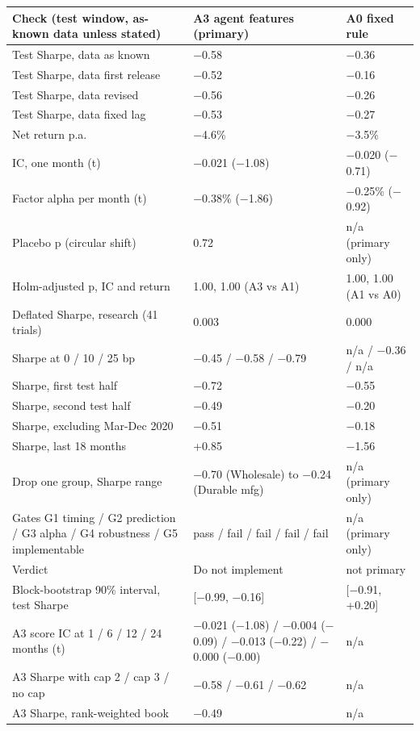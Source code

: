 \begin{tabular}{p{6.1cm}p{5.0cm}p{3.6cm}}
\toprule
Check (test window, as-known data unless stated) & A3 agent features (primary) & A0 fixed rule \\
\midrule
Test Sharpe, data as known & $-$0.58 & $-$0.36 \\
Test Sharpe, data first release & $-$0.52 & $-$0.16 \\
Test Sharpe, data revised & $-$0.56 & $-$0.26 \\
Test Sharpe, data fixed lag & $-$0.53 & $-$0.27 \\
Net return p.a. & $-$4.6\% & $-$3.5\% \\
IC, one month (t) & $-$0.021 ($-$1.08) & $-$0.020 ($-$0.71) \\
Factor alpha per month (t) & $-$0.38\% ($-$1.86) & $-$0.25\% ($-$0.92) \\
Placebo p (circular shift) & 0.72 & n/a (primary only) \\
Holm-adjusted p, IC and return & 1.00, 1.00 (A3 vs A1) & 1.00, 1.00 (A1 vs A0) \\
Deflated Sharpe, research (41 trials) & 0.003 & 0.000 \\
Sharpe at 0 / 10 / 25 bp & $-$0.45 / $-$0.58 / $-$0.79 & n/a / $-$0.36 / n/a \\
Sharpe, first test half & $-$0.72 & $-$0.55 \\
Sharpe, second test half & $-$0.49 & $-$0.20 \\
Sharpe, excluding Mar-Dec 2020 & $-$0.51 & $-$0.18 \\
Sharpe, last 18 months & +0.85 & $-$1.56 \\
Drop one group, Sharpe range & $-$0.70 (Wholesale) to $-$0.24 (Durable mfg) & n/a (primary only) \\
Gates G1 timing / G2 prediction / G3 alpha / G4 robustness / G5 implementable & pass / fail / fail / fail / fail & n/a (primary only) \\
Verdict & Do not implement & not primary \\
Block-bootstrap 90\% interval, test Sharpe & [$-$0.99, $-$0.16] & [$-$0.91, +0.20] \\
A3 score IC at 1 / 6 / 12 / 24 months (t) & $-$0.021 ($-$1.08) / $-$0.004 ($-$0.09) / $-$0.013 ($-$0.22) / $-$0.000 ($-$0.00) & n/a \\
A3 Sharpe with cap 2 / cap 3 / no cap & $-$0.58 / $-$0.61 / $-$0.62 & n/a \\
A3 Sharpe, rank-weighted book & $-$0.49 & n/a \\
\bottomrule
\end{tabular}
